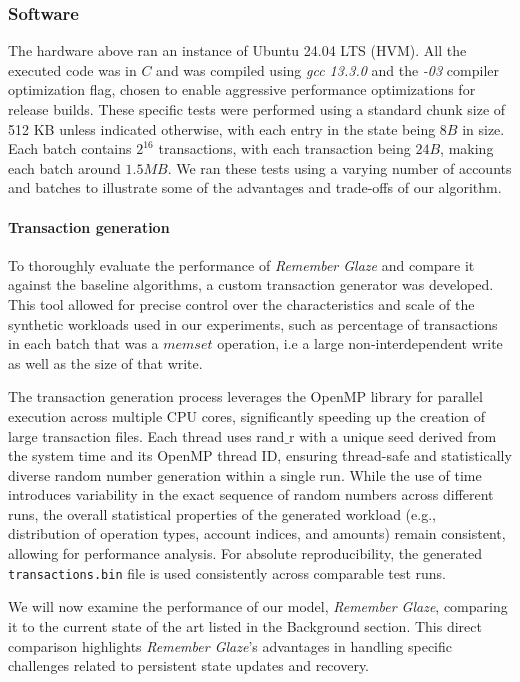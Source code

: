 \documentclass[conference]{IEEEtran}
\begin{document}
\subsubsection{Software}
The hardware above ran an instance of Ubuntu 24.04 LTS (HVM). All the executed code was in $C$ and was compiled using \textit{gcc 13.3.0} and the \textit{-03} compiler optimization flag, chosen to enable aggressive performance optimizations for release builds. These specific tests were performed using a standard chunk size of 512 KB unless indicated otherwise, with each entry in the state being $8B$ in size. Each batch contains $2^{16}$ transactions, with each transaction being $24B$, making each batch around $1.5MB$. We ran these tests using a varying number of accounts and batches to illustrate some of the advantages and trade-offs of our algorithm.
\paragraph{Transaction generation}
To thoroughly evaluate the performance of \textit{Remember Glaze} and compare it against the baseline algorithms, a custom transaction generator was developed. This tool allowed for precise control over the characteristics and scale of the synthetic workloads used in our experiments, such as percentage of transactions in each batch that was a $memset$ operation, i.e a large non-interdependent write as well as the size of that write.

The transaction generation process leverages the OpenMP library for parallel execution across multiple CPU cores, significantly speeding up the creation of large transaction files. Each thread uses rand$\_$r with a unique seed derived from the system time and its OpenMP thread ID, ensuring thread-safe and statistically diverse random number generation within a single run. While the use of time introduces variability in the exact sequence of random numbers across different runs, the overall statistical properties of the generated workload (e.g., distribution of operation types, account indices, and amounts) remain consistent, allowing for performance analysis. For absolute reproducibility, the generated \texttt{transactions.bin} file is used consistently across comparable test runs.

We will now examine the performance of our model, \textit{Remember Glaze}, comparing it to the current state of the art listed in the Background section. This direct comparison highlights \textit{Remember Glaze}'s advantages in handling specific challenges related to persistent state updates and recovery. 
\end{document}
